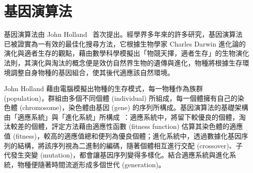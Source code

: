 


\section{基因演算法}
\label{sec:relatedworks-ga}

基因演算法由 John Holland~\cite{holland1992adaptation} 首次提出。經學界多年來的許多研究，基因演算法已被證實為一有效的最佳化搜尋方法，它根據生物學家 Charles Darwin 進化論的演化與適者生存的觀點，藉由數學科學模擬出「物競天擇，適者生存」的生物演化法則，其演化與淘汰的概念便是效仿自然界生物的遺傳與進化，物種將根據生存環境調整自身物種的基因組合，使其後代適應該自然環境。

John Holland 藉由電腦模擬出物種的生存模式，每一物種作為族群 (population)，群組由多個不同個體 (individual) 所組成，每一個體擁有自己的染色體 (chromosome)，染色體由基因 (gene) 的序列所構成。基因演算法的基礎架構由「適應系統」與「進化系統」所構成~\cite{holland1992adaptation}：適應系統中，將留下較優良的個體，淘汰較差的個體，評定方法藉由適應性函數 (fitness function) 估算其染色體的適應值 (fitness)，較高的適應值總和便列為優良個體；進化系統中，透過數據化基因序列的結構，將該序列視為二進制的編碼，隨著個體相互進行交配 (crossover)、子代發生突變 (mutation)，都會讓基因序列變得多樣化。結合適應系統與進化系統，物種便隨著時間流逝形成多個世代 (generation)。


